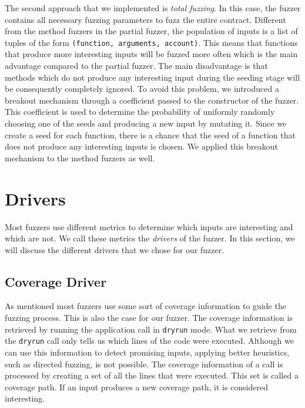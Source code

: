 The second approach that we implemented is \textit{total fuzzing}.
In this case, the fuzzer contains all necessary fuzzing parameters to fuzz the entire contract.
Different from the method fuzzers in the partial fuzzer, the population of inputs is a list of tuples of the form \texttt{(function, arguments, account)}.
This means that functions that produce more interesting inputs will be fuzzed more often which is the main advantage compared to the partial fuzzer.
The main disadvantage is that methods which do not produce any interesting input during the seeding stage will be consequently completely ignored.
To avoid this problem, we introduced a breakout mechanism through a coefficient passed to the constructor of the fuzzer.
This coefficient is used to determine the probability of uniformly randomly choosing one of the seeds and producing a new input by mutating it.
Since we create a seed for each function, there is a chance that the seed of a function that does not produce any interesting inputs is chosen.
We applied this breakout mechanism to the method fuzzers as well.



\section{Drivers}\label{section:drivers}
Most fuzzers use different metrics to determine which inputs are interesting and which are not.
We call these metrics the \textit{drivers} of the fuzzer.
In this section, we will discuss the different drivers that we chose for our fuzzer.

\subsection*{Coverage Driver}
As mentioned most fuzzers use some sort of coverage information to guide the fuzzing process.
This is also the case for our fuzzer.
The coverage information is retrieved by running the application call in \texttt{dryrun} mode.
What we retrieve from the \texttt{dryrun} call only tells us which lines of the code were executed.
Although we can use this information to detect promising inputs, applying better heuristics, such as directed fuzzing, is not possible.
The coverage information of a call is processed by creating a set of all the lines that were executed.
This set is called a coverage path.
If an input produces a new coverage path, it is considered interesting.

